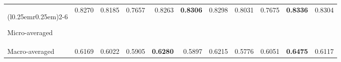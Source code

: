 \begin{table}[!t]
\begin{tabular}{lrrrrrrrrrr}
\cmidrule(r{0.25em}){1-1}\cmidrule(l{0.25em}r{0.25em}){2-6}\cmidrule(l{0.25em}){7-11}

Micro-averaged & 0.8270 & 0.8185 & 0.7657 & 0.8263          & \textbf{0.8306} & 0.8298 & 0.8031 & 0.7675 & \textbf{0.8336} & 0.8304\\
Macro-averaged & 0.6169 & 0.6022 & 0.5905 & \textbf{0.6280} & 0.5897          & 0.6215 & 0.5776 & 0.6051 & \textbf{0.6475} & 0.6117\\

\bottomrule

\end{tabular}
\end{table}
\endgroup
